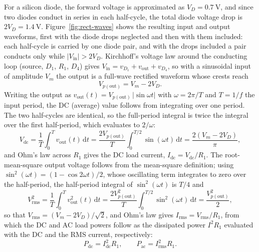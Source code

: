\documentclass[12pt,a4paper]{article}
\begin{document}
	For a silicon diode, the forward voltage is approximated as $V_D = \SI{0.7}{\volt}$, and since two diodes conduct in series in each half-cycle, the total diode voltage drop is $2V_D = \SI{1.4}{\volt}$. Figure~\ref{fig:rect-waves} shows the resulting input and output waveforms, first with the diode drops neglected and then with them included: each half-cycle is carried by one diode pair, and with the drops included a pair conducts only while $|V_{\mathrm{in}}|>2V_D$. Kirchhoff's voltage law around the conducting loop (source, $D_1$, $R_1$, $D_4$) gives $V_{\mathrm{in}} = v_{D_1} + v_{\mathrm{out}} + v_{D_4}$, so with a sinusoidal input of amplitude $V_m$ the output is a full-wave rectified waveform whose crests reach
	\begin{equation}
		V_{p(\mathrm{out})} = V_m - 2V_D .
		\label{eq:vp-out}
	\end{equation}
	Writing the output as $v_{\mathrm{out}}(t) = V_{p(\mathrm{out})}\,|\sin\omega t|$ with $\omega = 2\pi/T$ and $T = 1/f$ the input period, the DC (average) value follows from integrating over one period. The two half-cycles are identical, so the full-period integral is twice the integral over the first half-period, which evaluates to $2/\omega$:
	\begin{equation}
		V_{\mathrm{dc}}
		= \frac{1}{T}\int_{0}^{T} v_{\mathrm{out}}(t)\,\mathrm{d}t
		= \frac{2V_{p(\mathrm{out})}}{T}\int_{0}^{T/2}\sin(\omega t)\,\mathrm{d}t
		= \frac{2\left(V_m - 2V_D\right)}{\pi},
		\label{eq:vdc}
	\end{equation}
	and Ohm's law across $R_1$ gives the DC load current, $I_{\mathrm{dc}} = V_{\mathrm{dc}}/R_1$.
	The root-mean-square output voltage follows from the mean-square definition; using $\sin^{2}(\omega t) = \left(1-\cos 2\omega t\right)/2$, whose oscillating term integrates to zero over the half-period, the half-period integral of $\sin^{2}(\omega t)$ is $T/4$ and
	\begin{equation}
		V_{\mathrm{rms}}^{2}
		= \frac{1}{T}\int_{0}^{T} v_{\mathrm{out}}^{2}(t)\,\mathrm{d}t
		= \frac{2V_{p(\mathrm{out})}^{2}}{T}\int_{0}^{T/2}\sin^{2}(\omega t)\,\mathrm{d}t
		= \frac{V_{p(\mathrm{out})}^{2}}{2},
		\label{eq:vrms}
	\end{equation}
	so that $V_{\mathrm{rms}} = (V_m - 2V_D)/\sqrt{2}$, and Ohm's law gives $I_{\mathrm{rms}} = V_{\mathrm{rms}}/R_1$, from which the DC and AC load powers follow as the dissipated power $I^{2}R_1$ evaluated with the DC and the RMS current, respectively:
	\begin{equation}
		P_{\mathrm{dc}} = I_{\mathrm{dc}}^{2}R_1,
		\qquad
		P_{\mathrm{ac}} = I_{\mathrm{rms}}^{2}R_1 .
		\label{eq:powers}
	\end{equation}
\end{document}
